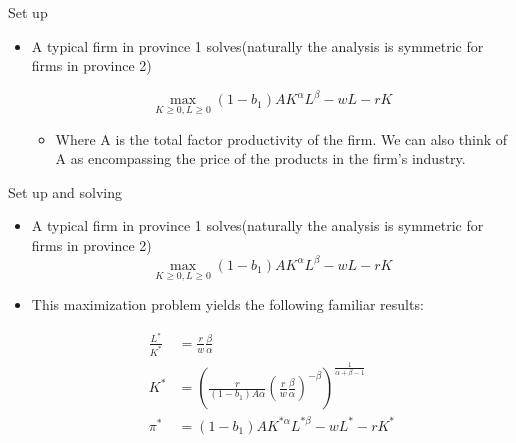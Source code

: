 \documentclass{beamer}
\begin{document}
\begin{frame}{Set up}

\begin{itemize}
\item A typical firm in province 1 solves(naturally the analysis is symmetric for firms in province 2)

\begin{equation}
\underset{K\geqslant 0,L\geqslant 0}{\max}\left( 1-b_1 \right) AK^{\alpha}L^{\beta}-wL-rK
\end{equation}

\begin{itemize}
\item Where A is the total factor productivity of the firm. We can also think of A as encompassing the price of the products in the firm's industry.
\end{itemize}

\end{itemize}

\end{frame}

\begin{frame}{Set up and solving}
\begin{itemize}
\item A typical firm in province 1 solves(naturally the analysis is symmetric for firms in province 2)
\begin{equation}
\underset{K\geqslant 0,L\geqslant 0}{\max}\left( 1-b_1 \right) AK^{\alpha}L^{\beta}-wL-rK
\end{equation}
\item This maximization problem yields the following familiar results:

\begin{align}
\frac{L^*}{K^*} & =\frac{r}{w}\frac{\beta}{\alpha}  \\
K^* & =\left( \frac{r}{\left( 1-b_1 \right) A\alpha}\left( \frac{r}{w}\frac{\beta}{\alpha} \right) ^{-\beta} \right) ^{\frac{1}{\alpha +\beta -1}} \\
\pi ^* & = \left( 1-b_1 \right) AK^{*\alpha}L^{*\beta}-wL^*-rK^*
\end{align}

\end{itemize}
\end{frame}
\end{document}
